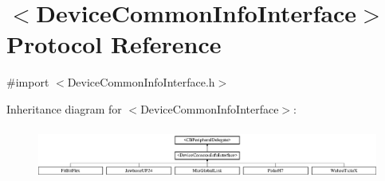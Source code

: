 \hypertarget{protocol_device_common_info_interface-p}{\section{$<$Device\-Common\-Info\-Interface$>$ Protocol Reference}
\label{protocol_device_common_info_interface-p}
}


{\ttfamily \#import $<$Device\-Common\-Info\-Interface.\-h$>$}

Inheritance diagram for $<$Device\-Common\-Info\-Interface$>$\-:\begin{figure}[H]
\begin{center}
\leavevmode
\includegraphics[height=1.740933cm]{protocol_device_common_info_interface-p}
\end{center}
\end{figure}
